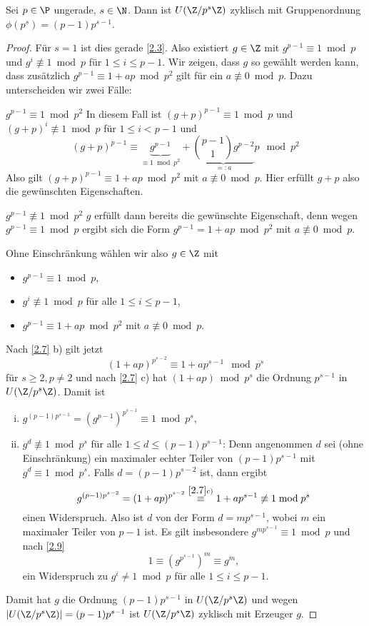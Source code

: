 \begin{st} \label{2.8}
	Sei $p \in \P$ ungerade, $s \in \N$.
	Dann ist $U(\Z / p^s \Z)$ zyklisch mit Gruppenordnung $\phi(p^s) = (p-1)p^{s-1}$.
	\begin{proof}
		Für $s = 1$ ist dies gerade \ref{2.3}.
		Also existiert $g \in \Z$ mit $g^{p-1} \equiv 1 \bmod p$ und $g^i \not\equiv 1 \bmod p$ für $1 \le i \le p -1$.
		Wir zeigen, dass $g$ so gewählt werden kann, dass zusätzlich $g^{p-1} \equiv 1 + ap \bmod p^2$ gilt für ein $a \not\equiv 0 \bmod p$.
		Dazu unterscheiden wir zwei Fälle:
		\begin{segnb}{$g^{p-1} \equiv 1 \bmod p^2$}
			In diesem Fall ist $(g + p)^{p-1} \equiv 1 \bmod p$ und $(g + p)^i \not\equiv 1 \bmod p$ für $1 \le i < p-1$ und
			\[
				(g + p)^{p - 1} \equiv \underbrace{g^{p-1}}_{\equiv 1 \bmod p^2} + \underbrace{\binom{p-1}{1}g^{p-2}}_{=: a} p \mod p^2
			\]
			Also gilt $(g + p)^{p-1} \equiv 1 + ap \bmod p^2$ mit $a \not\equiv 0 \bmod p$.
			Hier erfüllt $g + p$ also die gewünschten Eigenschaften.
		\end{segnb}
		\begin{segnb}{$g^{p-1} \not\equiv 1 \bmod p^2$}
			$g$ erfüllt dann bereits die gewünschte Eigenschaft, denn wegen $g^{p-1} \equiv 1 \bmod p$ ergibt sich die Form $g^{p-1} = 1 + ap \bmod p^2$ mit $a \not\equiv 0 \bmod p$.
		\end{segnb}
		Ohne Einschränkung wählen wir also $g \in \Z$ mit
		\begin{itemize}
			\item
				$g^{p-1} \equiv 1 \bmod p$,
			\item
				$g^i \not\equiv 1 \bmod p$ für alle $1 \le i \le p - 1$,
			\item
				$g^{p-1} \equiv 1 + ap \bmod p^2$ mit $a \not\equiv 0 \bmod p$.
		\end{itemize}
		Nach \ref{2.7} b) gilt jetzt
		\[
			(1 + ap)^{p^{s-2}} \equiv 1 + ap^{s-1} \mod p^s
		\]
		für $s \ge 2, p \neq 2$ und nach \ref{2.7} c) hat $(1 + ap) \bmod p^s$ die Ordnung $p^{s-1}$ in $U(\Z / p^s \Z)$.
		Damit ist
		\begin{enumerate}[i)]
			\item
				$g^{(p-1)p^{s-1}} = (g^{p-1})^{p^{s-1}} \equiv 1 \bmod p^s$,
			\item
				$g^d \not\equiv 1 \bmod p^s$ für alle $1 \le d \le (p-1)p^{s-1}$:
				Denn angenommen $d$ sei (ohne Einschränkung) ein maximaler echter Teiler von $(p-1)p^{s-1}$ mit $g^d \equiv 1 \bmod p^s$.
				Falls $d = (p-1)p^{s-2}$ ist, dann ergibt
				\[
					g^{(p-1)p^{s-2}} = (1 + ap)^{p^{s-2}} \stackrel{\ref{2.7} c)}\equiv 1 + ap^{s-1} \not\equiv 1 \bmod p^s
				\]
				einen Widerspruch.
				Also ist $d$ von der Form $d = mp^{s-1}$, wobei $m$ ein maximaler Teiler von $p-1$ ist.
				Es gilt insbesondere $g^{mp^{s-1}} \equiv 1 \bmod p$ und nach \ref{2.9}
				\[
					1 \equiv (g^{p^{s-1}})^m \equiv g^m,
				\]
				ein Widerspruch zu $g^i \neq 1 \bmod p$ für alle $1 \le i \le p - 1$.
		\end{enumerate}
		Damit hat $g$ die Ordnung $(p-1)p^{s-1}$ in $U(\Z/p^s\Z)$ und wegen $|U(\Z/p^s\Z)| = (p-1)p^{s-1}$ ist $U(\Z/p^s \Z)$ zyklisch mit Erzeuger $g$.
	\end{proof}
\end{st}

